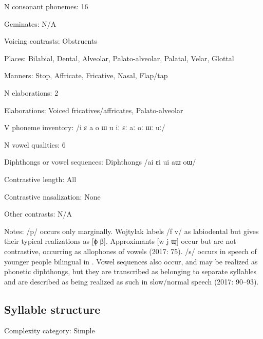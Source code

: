 {\begin{appendixdesc}
\item[N consonant phonemes:] 16

\item[Geminates:] N/A

\item[Voicing contrasts:] Obstruents

\item[Places:] Bilabial, Dental, Alveolar, Palato-alveolar, Palatal, Velar, Glottal

\item[Manners:] Stop, Affricate, Fricative, Nasal, Flap/tap

\item[N elaborations:] 2

\item[Elaborations:] Voiced fricatives/affricates, Palato-alveolar

\item[V phoneme inventory:] /i ɛ a o ɯ u iː ɛː aː oː ɯː uː/

\item[N vowel qualities:] 6

\item[Diphthongs or vowel sequences:] Diphthongs /ai ɛi ui aɯ oɯ/

\item[Contrastive length:] All

\item[Contrastive nasalization:] None

\item[Other contrasts:] N/A

\item[Notes:] /p/ occurs only marginally. Wojtylak labels /f v/ as labiodental but gives their typical realizations as [ɸ β]. Approximants [w j ɰ] occur but are not contrastive, occurring as allophones of vowels (2017: 75). /s/ occurs in speech of younger people bilingual in . Vowel sequences also occur, and may be realized as phonetic diphthongs, but they are transcribed as belonging to separate syllables and are described as being realized as such in slow/normal speech (2017: 90--93).
\end{appendixdesc}
\subsection*{Syllable structure}
\begin{appendixdesc}

\item[Complexity category:] Simple


\end{appendixdesc}}
